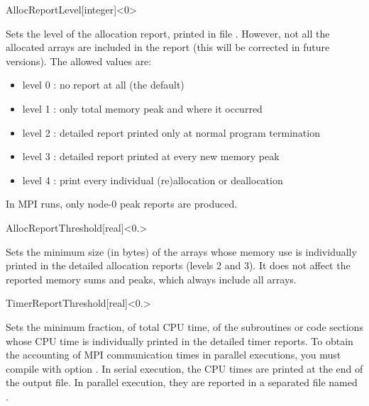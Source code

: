 \begin{fdfentry}{AllocReportLevel}[integer]<$0$>

    Sets the level of the allocation report, printed in file
    . However, not all the allocated arrays are included
    in the report (this will be corrected in future versions). The
    allowed values are:
    \begin{itemize}
      \item%
      level 0 : no report at all (the default)
      \item%
      level 1 : only total memory peak and where it occurred
      \item%
      level 2 : detailed report printed only at
      normal program termination
      \item%
      level 3 : detailed report printed at every new memory peak
      \item%
      level 4 : print every individual (re)allocation or deallocation
    \end{itemize}
  
    \note In MPI runs, only node-0 peak reports are produced.
  
  \end{fdfentry}
  
  
  \begin{fdfentry}{AllocReportThreshold}[real]<$0.$>
  
  Sets the minimum size (in bytes) of the arrays whose memory use is
  individually printed in the detailed allocation reports (levels 2 and
  3). It does not affect the reported memory sums and peaks, which
  always include all arrays.
  
  \end{fdfentry}
  
  \begin{fdfentry}{TimerReportThreshold}[real]<$0.$>
  
    Sets the minimum fraction, of total CPU time, of the subroutines or
    code sections whose CPU time is individually printed in the detailed
    timer reports. To obtain the accounting of MPI communication times
    in parallel executions, you must compile with option
    .
    In serial execution, the CPU times are printed at the end of the
    output file. In parallel execution, they are reported in a separated
    file named .
  
  \end{fdfentry}
  
